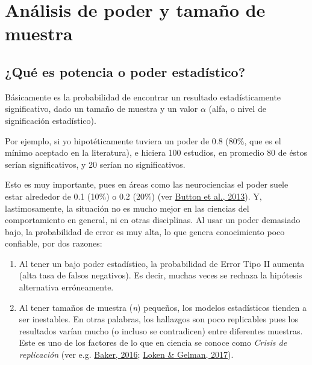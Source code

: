 \documentclass[
]{article}
\providecommand{\tightlist}{%
  \setlength{\itemsep}{0pt}\setlength{\parskip}{0pt}}
\begin{document}
\hypertarget{anuxe1lisis-de-poder-y-tamauxf1o-de-muestra}{%
\section{Análisis de poder y tamaño de
muestra}\label{anuxe1lisis-de-poder-y-tamauxf1o-de-muestra}}

\hypertarget{power}{%
\subsection{¿Qué es potencia o poder estadístico?}\label{power}}

Básicamente es la probabilidad de encontrar un resultado
estadísticamente significativo, dado un tamaño de muestra y un valor
\(\alpha\) (alfa, o nivel de significación estadístico).

Por ejemplo, si yo hipotéticamente tuviera un poder de 0.8 (80\%, que es
el mínimo aceptado en la literatura), e hiciera 100 estudios, en
promedio 80 de éstos serían significativos, y 20 serían no
significativos.

Esto es muy importante, pues en áreas como las neurociencias el poder
suele estar alrededor de 0.1 (10\%) o 0.2 (20\%) (ver
\protect\hyperlink{ref-buttonPowerFailureWhy2013}{Button et al., 2013}).
Y, lastimosamente, la situación no es mucho mejor en las ciencias del
comportamiento en general, ni en otras disciplinas. Al usar un poder
demasiado bajo, la probabilidad de error es muy alta, lo que genera
conocimiento poco confiable, por dos razones:

\begin{enumerate}
\def\labelenumi{\arabic{enumi}.}
\tightlist
\item
  Al tener un bajo poder estadístico, la probabilidad de Error Tipo II
  aumenta (alta tasa de falsos negativos). Es decir, muchas veces se
  rechaza la hipótesis alternativa erróneamente.
\item
  Al tener tamaños de muestra (\emph{n}) pequeños, los modelos
  estadísticos tienden a ser inestables. En otras palabras, los
  hallazgos son poco replicables pues los resultados varían mucho (o
  incluso se contradicen) entre diferentes muestras. Este es uno de los
  factores de lo que en ciencia se conoce como \emph{Crisis de
  replicación} (ver e.g.
  \protect\hyperlink{ref-baker500ScientistsLift2016}{Baker, 2016};
  \protect\hyperlink{ref-lokenMeasurementErrorReplication2017}{Loken \&
  Gelman, 2017}).
\end{enumerate}
\end{document}
